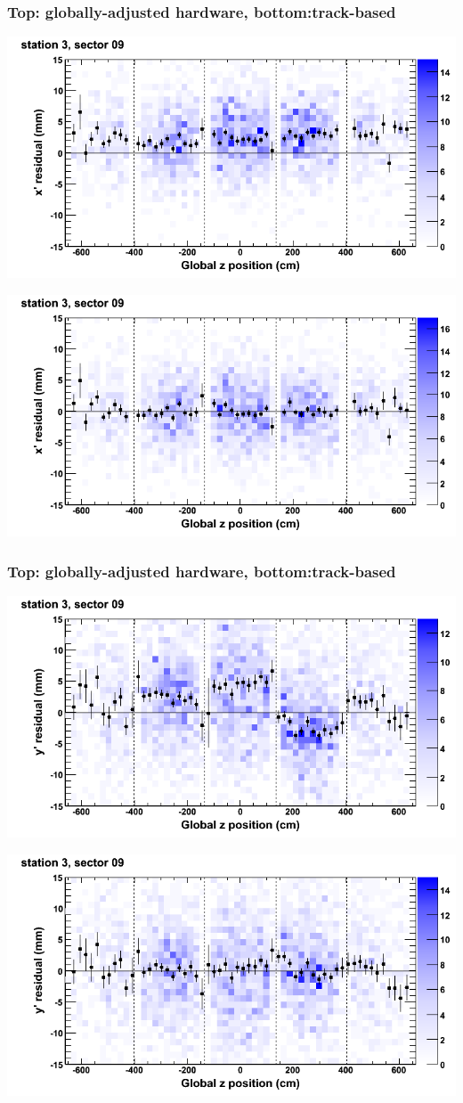 \documentclass[compress]{beamer}
\begin{document}
\begin{frame}
\frametitle{Top: globally-adjusted hardware, bottom:track-based}
\includegraphics[width=0.7\linewidth]{NOV4_mapplots_HW/DTvsz_st3sec09_x.png}

\includegraphics[width=0.7\linewidth]{NOV4_mapplots/DTvsz_st3sec09_x.png}
\end{frame}

\begin{frame}
\frametitle{Top: globally-adjusted hardware, bottom:track-based}
\includegraphics[width=0.7\linewidth]{NOV4_mapplots_HW/DTvsz_st3sec09_y.png}

\includegraphics[width=0.7\linewidth]{NOV4_mapplots/DTvsz_st3sec09_y.png}
\end{frame}
\end{document}
